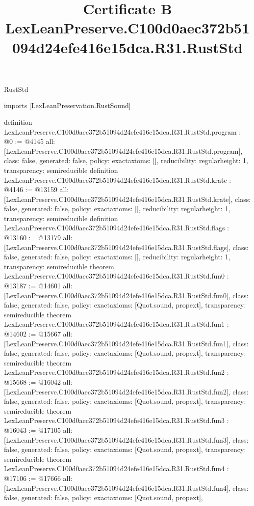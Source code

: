 \begin{lexlean}{RustStd}
\title{Certificate B LexLeanPreserve.C100d0aec372b51094d24efe416e15dca.R31.RustStd}
\begin{coremodule}
imports [LexLeanPreservation.RustSound]

definition LexLeanPreserve.C100d0aec372b51094d24efe416e15dca.R31.RustStd.program : @0 := @4145 {
  all: [LexLeanPreserve.C100d0aec372b51094d24efe416e15dca.R31.RustStd.program],
  class: false,
  generated: false,
  policy: exact{axioms: []},
  reducibility: regular{height: 1},
  transparency: semireducible
}
definition LexLeanPreserve.C100d0aec372b51094d24efe416e15dca.R31.RustStd.krate : @4146 := @13159 {
  all: [LexLeanPreserve.C100d0aec372b51094d24efe416e15dca.R31.RustStd.krate],
  class: false,
  generated: false,
  policy: exact{axioms: []},
  reducibility: regular{height: 1},
  transparency: semireducible
}
definition LexLeanPreserve.C100d0aec372b51094d24efe416e15dca.R31.RustStd.flags : @13160 := @13179 {
  all: [LexLeanPreserve.C100d0aec372b51094d24efe416e15dca.R31.RustStd.flags],
  class: false,
  generated: false,
  policy: exact{axioms: []},
  reducibility: regular{height: 1},
  transparency: semireducible
}
theorem LexLeanPreserve.C100d0aec372b51094d24efe416e15dca.R31.RustStd.fun0 : @13187 := @14601 {
  all: [LexLeanPreserve.C100d0aec372b51094d24efe416e15dca.R31.RustStd.fun0],
  class: false,
  generated: false,
  policy: exact{axioms: [Quot.sound, propext]},
  transparency: semireducible
}
theorem LexLeanPreserve.C100d0aec372b51094d24efe416e15dca.R31.RustStd.fun1 : @14602 := @15667 {
  all: [LexLeanPreserve.C100d0aec372b51094d24efe416e15dca.R31.RustStd.fun1],
  class: false,
  generated: false,
  policy: exact{axioms: [Quot.sound, propext]},
  transparency: semireducible
}
theorem LexLeanPreserve.C100d0aec372b51094d24efe416e15dca.R31.RustStd.fun2 : @15668 := @16042 {
  all: [LexLeanPreserve.C100d0aec372b51094d24efe416e15dca.R31.RustStd.fun2],
  class: false,
  generated: false,
  policy: exact{axioms: [Quot.sound, propext]},
  transparency: semireducible
}
theorem LexLeanPreserve.C100d0aec372b51094d24efe416e15dca.R31.RustStd.fun3 : @16043 := @17105 {
  all: [LexLeanPreserve.C100d0aec372b51094d24efe416e15dca.R31.RustStd.fun3],
  class: false,
  generated: false,
  policy: exact{axioms: [Quot.sound, propext]},
  transparency: semireducible
}
theorem LexLeanPreserve.C100d0aec372b51094d24efe416e15dca.R31.RustStd.fun4 : @17106 := @17666 {
  all: [LexLeanPreserve.C100d0aec372b51094d24efe416e15dca.R31.RustStd.fun4],
  class: false,
  generated: false,
  policy: exact{axioms: [Quot.sound, propext]},
}
\end{coremodule}
\end{lexlean}
